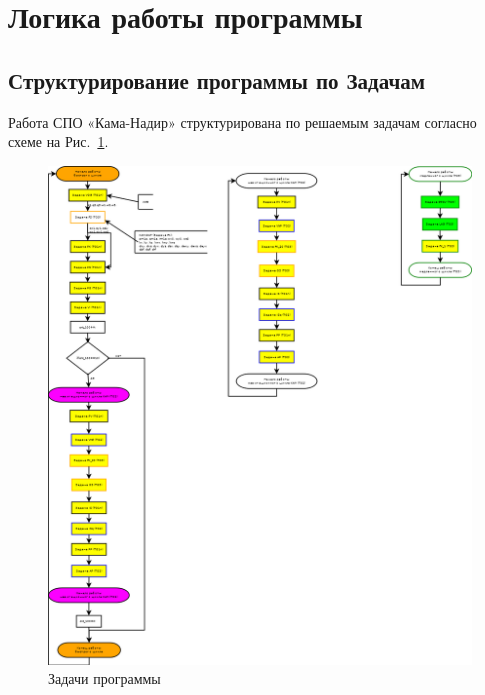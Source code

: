\section{Логика работы программы} \label{logic}
\subsection{Структурирование программы по Задачам}
Работа СПО «Кама-Надир» структурирована по решаемым задачам согласно  схеме на Рис.~\ref{fig:general_scheme}.
\begin{figure}[H]
    \centering
    \includegraphics[width=1.0\linewidth]{images/general_scheme.png}
    \caption{Задачи программы}
    \label{fig:general_scheme}
\end{figure}
\pagebreak
